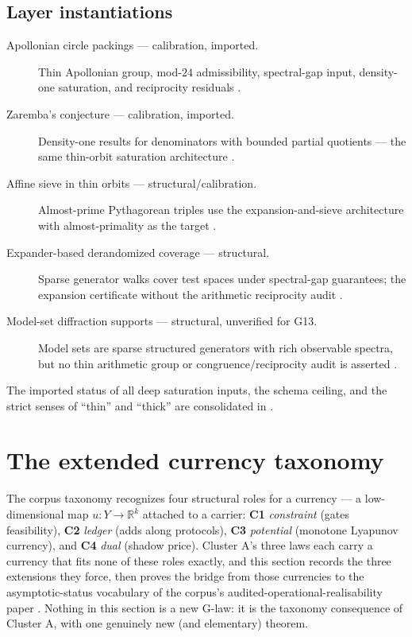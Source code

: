 \documentclass[11pt]{article}
\theoremstyle{definition}
\begin{document}
\subsection*{Layer instantiations}\label{layer-inst:G13}
\begin{description}
  \item[Apollonian circle packings --- calibration, imported.] Thin Apollonian group, mod-$24$
    admissibility, spectral-gap input, density-one saturation, and reciprocity residuals
    \citep{BourgainFuchs2010,BourgainKontorovich2014Apollonian,HaagEtAl2024}.
  \item[Zaremba's conjecture --- calibration, imported.] Density-one results for denominators with
    bounded partial quotients --- the same thin-orbit saturation architecture
    \citep{BourgainKontorovich2014Zaremba}.
  \item[Affine sieve in thin orbits --- structural/calibration.] Almost-prime Pythagorean triples use
    the expansion-and-sieve architecture with almost-primality as the target
    \citep{KontorovichOh2012}.
  \item[Expander-based derandomized coverage --- structural.] Sparse generator walks cover test
    spaces under spectral-gap guarantees; the expansion certificate without the arithmetic
    reciprocity audit \citep{HooryLinialWigderson2006}.
  \item[Model-set diffraction supports --- structural, unverified for G13.] Model sets are sparse
    structured generators with rich observable spectra, but no thin arithmetic group or
    congruence/reciprocity audit is asserted \citep{BaakeGrimm2013}.
\end{description}

The imported status of all deep saturation inputs, the schema ceiling, and the strict senses of
``thin'' and ``thick'' are consolidated in .
 \section{The extended currency taxonomy}\label{sec:currency-taxonomy}

The corpus taxonomy recognizes four structural roles for a currency --- a low-dimensional map
$u : Y \to \mathbb{R}^k$ attached to a carrier: \textbf{C1} \emph{constraint} (gates feasibility),
\textbf{C2} \emph{ledger} (adds along protocols), \textbf{C3} \emph{potential} (monotone Lyapunov
currency), and \textbf{C4} \emph{dual} (shadow price). Cluster A's three laws each carry a currency
that fits none of these roles exactly, and this section records the three extensions they force,
then proves the bridge from those currencies to the asymptotic-status vocabulary of the corpus's
audited-operational-realisability paper \citep{Tsiokos2026AOR}. Nothing in this section is a new
G-law: it is the taxonomy consequence of Cluster A, with one genuinely new (and elementary) theorem.
\end{document}
